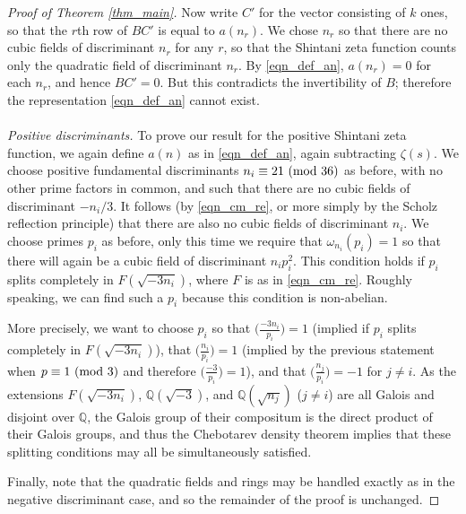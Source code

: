 \documentclass[12pt]{amsart}
\theoremstyle{remark}
\numberwithin{theorem}{section} \numberwithin{equation}{section}
\newcommand{\Q}{\mathbb{Q}}
\newcommand{\textmod}{{\text {\rm mod}}}
\begin{document}
\begin{proof}[Proof of Theorem \ref{thm_main}]
Now write $C'$ for the vector consisting of $k$ ones, so that the $r$th row of
$B C'$ is equal to $a(n_r)$. We chose $n_r$ so that there are no cubic fields of discriminant
$n_r$ for any $r$, so that the Shintani zeta function counts only the quadratic field of discriminant $n_r$.
By \eqref{eqn_def_an}, $a(n_r) = 0$ for each $n_r$, and hence $B C' = 0$.
But this contradicts the invertibility of $B$; therefore the representation \eqref{eqn_def_an} cannot exist.
\\
\\
{\itshape Positive discriminants.}
To prove our result for the positive Shintani zeta function, we again
define $a(n)$ as in \eqref{eqn_def_an}, again
subtracting $ \zeta(s)$. We choose positive fundamental discriminants $n_i \equiv 21 \ (\textmod \ 36)$ as before,
with no other prime factors in common, and
such that there are no cubic fields of discriminant $- n_i/3$. It follows (by \eqref{eqn_cm_re}, or more simply by
the Scholz reflection principle) that there are also no cubic fields of discriminant $n_i$.
We choose primes $p_i$ as
before, only this time we require that $\omega_{n_i}(p_i) = 1$ so that there will again be a cubic field of discriminant
$n_i p_i^2$. This condition holds if $p_i$ splits completely in $F(\sqrt{-3 n_i})$, where $F$ is as in 
\eqref{eqn_cm_re}. Roughly speaking, we can find such a $p_i$ because this condition is non-abelian.

More precisely, we want to choose $p_i$ so that $\big( \frac{-3 n_i}{p_i} \big) = 1$ (implied if
$p_i$ splits completely in $F(\sqrt{-3 n_i})$), that $\big( \frac{n_i}{p_i} \big) = 1$ (implied by the previous statement
when
$p \equiv 1 \ (\textmod \ 3)$ and therefore $\big( \frac{-3}{p_i} \big) = 1$), and that 
$\big( \frac{n_j}{p_i}) = -1$ for $j \neq i$. As the extensions $F(\sqrt{-3 n_i})$, $\Q(\sqrt{-3})$, and $\Q(\sqrt{n_j})$ ($j \neq i$) are
all Galois and disjoint over $\Q$, the Galois group of their compositum is the direct product of their
Galois groups, and thus the Chebotarev density theorem implies that these splitting conditions may all
be simultaneously satisfied.

Finally, note that the quadratic fields and rings may be handled exactly as in
the negative discriminant case, and so the remainder
of the proof is unchanged.

\end{proof}
\end{document}
